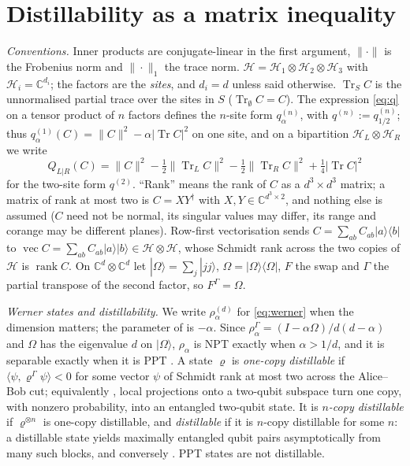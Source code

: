 \documentclass[aps,pra,twocolumn,superscriptaddress,nofootinbib,longbibliography]{revtex4-2}
\newcommand{\C}{\mathbb C}
\newcommand{\Hh}{\mathcal H}
\newcommand{\ip}[2]{\langle #1,#2\rangle}
\newcommand{\ket}[1]{|#1\rangle}
\newcommand{\bra}[1]{\langle #1|}
\newcommand{\Om}{\Omega}
\DeclareMathOperator{\Tr}{Tr}
\DeclareMathOperator{\rank}{rank}
\DeclareMathOperator{\vecop}{vec}
\theoremstyle{plain}
\theoremstyle{definition}
\theoremstyle{remark}
\begin{document}
\section{Distillability as a matrix inequality}\label{sec:setup}

\emph{Conventions.} Inner products are conjugate-linear in the first argument, $\|\cdot\|$ is the Frobenius norm and $\|\cdot\|_1$ the trace norm. $\Hh=\Hh_1\otimes\Hh_2\otimes\Hh_3$ with $\Hh_i=\C^{d_i}$; the factors are the \emph{sites}, and $d_i=d$ unless said otherwise. $\Tr_SC$ is the unnormalised partial trace over the sites in $S$ ($\Tr_\emptyset C=C$). The expression \eqref{eq:q} on a tensor product of $n$ factors defines the $n$-site form $q^{(n)}_\alpha$, with $q^{(n)}:=q^{(n)}_{1/2}$; thus $q^{(1)}_\alpha(C)=\|C\|^2-\alpha|\Tr C|^2$ on one site, and on a bipartition $\Hh_L\otimes\Hh_R$ we write
\begin{equation}\label{eq:Q}
Q_{L|R}(C)=\|C\|^2-\tfrac12\|\Tr_LC\|^2-\tfrac12\|\Tr_RC\|^2+\tfrac14|\Tr C|^2
\end{equation}
for the two-site form $q^{(2)}$.
``Rank'' means the rank of $C$ as a $d^3\times d^3$ matrix; a matrix of rank at most two is $C=XY^\dagger$ with $X,Y\in\C^{d^3\times2}$, and nothing else is assumed ($C$ need not be normal, its singular values may differ, its range and corange may be different planes). Row-first vectorisation sends $C=\sum_{ab}C_{ab}\ket a\bra b$ to $\vecop C=\sum_{ab}C_{ab}\ket a\ket b\in\Hh\otimes\Hh$, whose Schmidt rank across the two copies of $\Hh$ is $\rank C$. On $\C^d\otimes\C^d$ let $\ket\Om=\sum_j\ket{jj}$, $\Om=\ket\Om\bra\Om$, $F$ the swap and $\Gamma$ the partial transpose of the second factor, so $F^\Gamma=\Om$.

\emph{Werner states and distillability.} We write $\rho^{(d)}_\alpha$ for \eqref{eq:werner} when the dimension matters; the parameter of \cite{Zenodo,Liu} is $-\alpha$. Since $\rho_\alpha^\Gamma=(I-\alpha\Om)/d(d-\alpha)$ and $\Om$ has the eigenvalue $d$ on $\ket\Om$, $\rho_\alpha$ is NPT exactly when $\alpha>1/d$, and it is separable exactly when it is PPT \cite{Werner,HHH96}. A state $\varrho$ is \emph{one-copy distillable} if $\ip\psi{\varrho^\Gamma\psi}<0$ for some vector $\psi$ of Schmidt rank at most two across the Alice--Bob cut; equivalently \cite{HHH98,DSSTT,DCLB}, local projections onto a two-qubit subspace turn one copy, with nonzero probability, into an entangled two-qubit state. It is \emph{$n$-copy distillable} if $\varrho^{\otimes n}$ is one-copy distillable, and \emph{distillable} if it is $n$-copy distillable for some $n$: a distillable state yields maximally entangled qubit pairs asymptotically from many such blocks, and conversely \cite{HHH98}. PPT states are not distillable.
\end{document}
